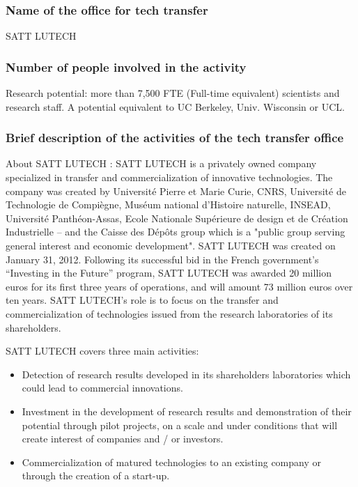 \documentclass[12pt,a4paper,twoside]{article}
\begin{document}
\subsubsection{Name of the office for tech transfer}
SATT LUTECH

\subsubsection{Number of people involved in the activity}
Research potential: more than 7,500 FTE (Full-time equivalent) scientists and research staff. A potential equivalent to UC Berkeley, Univ. Wisconsin or UCL.
 
 
\subsubsection{Brief description of the activities of the tech transfer office}
 About SATT LUTECH : SATT LUTECH is a privately owned company specialized in transfer and commercialization of innovative technologies. The company was created by Université Pierre et Marie Curie, CNRS, Université de Technologie de Compiègne, Muséum national d’Histoire naturelle, INSEAD, Université Panthéon-Assas, Ecole Nationale Supérieure de design et de Création Industrielle – and the Caisse des Dépôts group which is a "public group serving general interest and economic development". SATT LUTECH was created on January 31, 2012. Following its successful bid in the French government’s “Investing in the Future” program, SATT LUTECH was awarded 20 million euros for its first three years of operations, and will amount 73 million euros over ten years. SATT LUTECH’s role is to focus on the transfer and commercialization of technologies issued from the research laboratories of its shareholders.

SATT LUTECH covers three main activities:
\begin{itemize}
\item Detection of research results developed in its shareholders laboratories which could lead to commercial innovations.
\item Investment in the development of research results and demonstration of their potential through pilot projects, on a scale and under conditions that will create interest of companies and / or investors.
\item Commercialization of matured technologies to an existing company or through the creation of a start-up.
\end{itemize}
\end{document}
